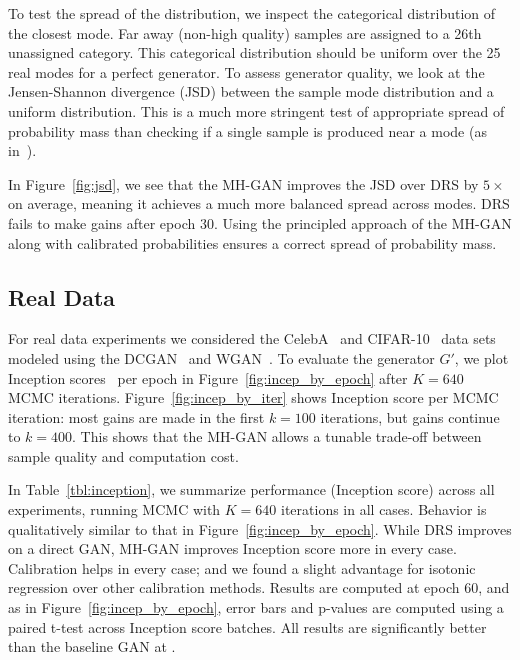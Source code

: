 \documentclass{article}
\begin{document}
To test the spread of the distribution, we inspect the categorical distribution of the closest mode.
Far away (non-high quality) samples are assigned to a 26th unassigned category.
This categorical distribution should be uniform over the 25 real modes for a perfect generator.
To assess generator quality, we look at the Jensen-Shannon divergence (JSD) between the sample mode distribution and a uniform distribution.
This is a much more stringent test of appropriate spread of probability mass than checking if a single sample is produced near a mode (as in~\citet{Azadi2018})\@.




In Figure~\ref{fig:jsd}, we see that the MH-GAN improves the JSD over DRS by $5 \times$ on average, meaning it achieves a much more balanced spread across modes.
DRS fails to make gains after epoch 30.
Using the principled approach of the MH-GAN along with calibrated probabilities ensures a correct spread of probability mass.

\subsection{Real Data}

For real data experiments we considered the CelebA~\citep{Liu2015} and CIFAR-10~\citep{Torralba2008} data sets modeled using the DCGAN~\citep{Radford2015} and WGAN~\citep{Arjovsky2017, Gulrajani2017}.
To evaluate the generator $G'$, we plot Inception scores~\citep{Salimans2016} per epoch in Figure~\ref{fig:incep_by_epoch} after $K=640$ MCMC iterations.
Figure~\ref{fig:incep_by_iter} shows Inception score per MCMC iteration:
most gains are made in the first $k=100$ iterations, but gains continue to $k=400$.
This shows that the MH-GAN allows a tunable trade-off between sample quality and computation cost.




In Table~\ref{tbl:inception}, we summarize performance (Inception score) across all experiments, running MCMC with $K=640$ iterations in all cases.
Behavior is qualitatively similar to that in Figure~\ref{fig:incep_by_epoch}.
While DRS improves on a direct GAN, MH-GAN improves Inception score more in every case.
Calibration helps in every case;
and we found a slight advantage for isotonic regression over other calibration methods.
Results are computed at epoch 60, and as in Figure~\ref{fig:incep_by_epoch}, error bars and p-values are computed using a paired t-test across Inception score batches.
All results are significantly better than the baseline GAN at .
\end{document}
